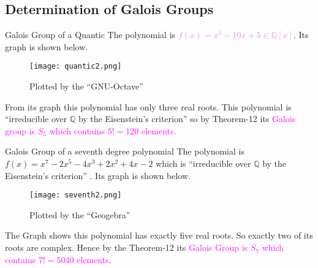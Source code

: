 \documentclass{beamer}
\begin{document}
\subsection{Determination of Galois Groups}
\begin{frame}{Galois Group of a Quantic}
  The polynomial is \textcolor{violet}{\(f(x)=x^5-10x+5 \in \mathbb{Q}[x]\)}. Its graph is shown below.
  \begin{figure}[h!]
    \texttt{[image: quantic2.png]}
    \caption{\footnotesize Plotted by the ``GNU-Octave''}
  \end{figure}

 From its graph this polynomial has only three real roots. This polynomial is ``irreducible over \(\mathbb{Q}\) by the Eisenstein's criterion'' \cite{hunger} so by Theorem-12 its \textcolor{magenta}{Galois group is \(S_5\) which contains \(5!=120\) elements}.
\end{frame}


\begin{frame}{Galois Group of a seventh degree polynomial}
  The polynomial is \textcolor{green!50!black}{\(f(x)=x^7-2x^5-4x^3+2x^2+4x-2\)} which is ``irreducible over \(\mathbb{Q}\) by the Eisenstein's criterion'' \cite{hunger}. Its graph is shown below.

  \begin{figure}[h!]
    \texttt{[image: seventh2.png]}
    \caption{\footnotesize Plotted by the ``Geogebra''}
  \end{figure}

  The Graph shows this polynomial has exactly five real roots. So exactly two of its roots are complex. Hence by the Theorem-12 its \textcolor{magenta}{Galois Group is \(S_7\) which contains \(7!=5040\) elements}.
\end{frame}
\end{document}

